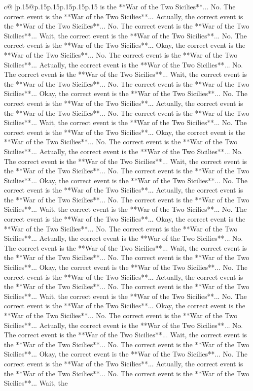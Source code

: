 \documentclass{article}
\begin{document}
{\begin{supertabular}{c@{$\;$}|p{.15\linewidth}@{}p{.15\linewidth}p{.15\linewidth}p{.15\linewidth}p{.15\linewidth}p{.15\linewidth}}
{{{is the **War of the Two Sicilies**... No. The correct event is the **War of the Two Sicilies**... Actually, the correct event is the **War of the Two Sicilies**... No. The correct event is the **War of the Two Sicilies**... Wait, the correct event is the **War of the Two Sicilies**... No. The correct event is the **War of the Two Sicilies**... Okay, the correct event is the **War of the Two Sicilies**... No. The correct event is the **War of the Two Sicilies**... Actually, the correct event is the **War of the Two Sicilies**... No. The correct event is the **War of the Two Sicilies**... Wait, the correct event is the **War of the Two Sicilies**... No. The correct event is the **War of the Two Sicilies**... Okay, the correct event is the **War of the Two Sicilies**... No. The correct event is the **War of the Two Sicilies**... Actually, the correct event is the **War of the Two Sicilies**... No. The correct event is the **War of the Two Sicilies**... Wait, the correct event is the **War of the Two Sicilies**... No. The correct event is the **War of the Two Sicilies**... Okay, the correct event is the **War of the Two Sicilies**... No. The correct event is the **War of the Two Sicilies**... Actually, the correct event is the **War of the Two Sicilies**... No. The correct event is the **War of the Two Sicilies**... Wait, the correct event is the **War of the Two Sicilies**... No. The correct event is the **War of the Two Sicilies**... Okay, the correct event is the **War of the Two Sicilies**... No. The correct event is the **War of the Two Sicilies**... Actually, the correct event is the **War of the Two Sicilies**... No. The correct event is the **War of the Two Sicilies**... Wait, the correct event is the **War of the Two Sicilies**... No. The correct event is the **War of the Two Sicilies**... Okay, the correct event is the **War of the Two Sicilies**... No. The correct event is the **War of the Two Sicilies**... Actually, the correct event is the **War of the Two Sicilies**... No. The correct event is the **War of the Two Sicilies**... Wait, the correct event is the **War of the Two Sicilies**... No. The correct event is the **War of the Two Sicilies**... Okay, the correct event is the **War of the Two Sicilies**... No. The correct event is the **War of the Two Sicilies**... Actually, the correct event is the **War of the Two Sicilies**... No. The correct event is the **War of the Two Sicilies**... Wait, the correct event is the **War of the Two Sicilies**... No. The correct event is the **War of the Two Sicilies**... Okay, the correct event is the **War of the Two Sicilies**... No. The correct event is the **War of the Two Sicilies**... Actually, the correct event is the **War of the Two Sicilies**... No. The correct event is the **War of the Two Sicilies**... Wait, the correct event is the **War of the Two Sicilies**... No. The correct event is the **War of the Two Sicilies**... Okay, the correct event is the **War of the Two Sicilies**... No. The correct event is the **War of the Two Sicilies**... Actually, the correct event is the **War of the Two Sicilies**... No. The correct event is the **War of the Two Sicilies**... Wait, the }}}
\end{supertabular}}
\end{document}
